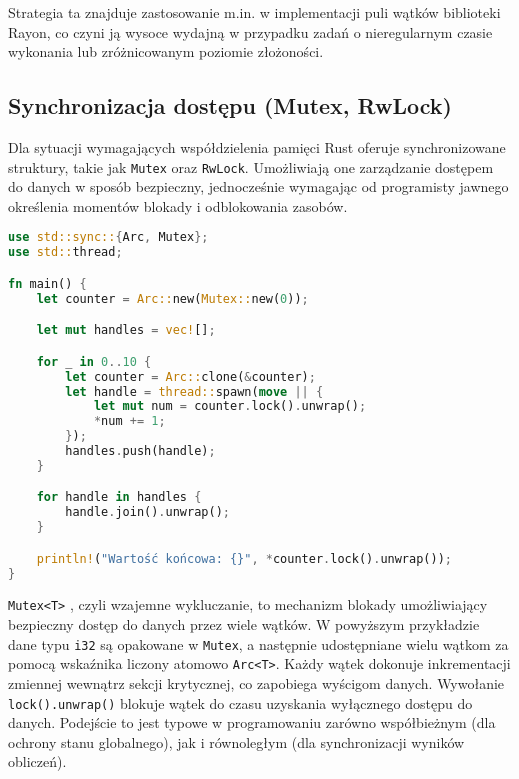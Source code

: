 Strategia ta znajduje zastosowanie m.in. w implementacji puli wątków biblioteki Rayon, co czyni ją wysoce wydajną w przypadku zadań o nieregularnym czasie wykonania lub zróżnicowanym poziomie złożoności.

\subsection{Synchronizacja dostępu (Mutex, RwLock)}
Dla sytuacji wymagających współdzielenia pamięci Rust oferuje synchronizowane struktury, takie jak \texttt{Mutex}  oraz \texttt{RwLock}. Umożliwiają one zarządzanie dostępem do danych w sposób bezpieczny, jednocześnie wymagając od programisty jawnego określenia momentów blokady i odblokowania zasobów.

\begin{lstlisting}[language=Rust, caption=Przykład użycia Mutex, label=mutex_example]
use std::sync::{Arc, Mutex};
use std::thread;

fn main() {
    let counter = Arc::new(Mutex::new(0));

    let mut handles = vec![];

    for _ in 0..10 {
        let counter = Arc::clone(&counter);
        let handle = thread::spawn(move || {
            let mut num = counter.lock().unwrap();
            *num += 1;
        });
        handles.push(handle);
    }

    for handle in handles {
        handle.join().unwrap();
    }

    println!("Wartość końcowa: {}", *counter.lock().unwrap());
}
\end{lstlisting}
\texttt{Mutex<T>} , czyli wzajemne wykluczanie, to mechanizm blokady umożliwiający bezpieczny dostęp do danych przez wiele wątków. W powyższym przykładzie dane typu \texttt{i32} są opakowane w \texttt{Mutex}, a następnie udostępniane wielu wątkom za pomocą wskaźnika liczony atomowo \texttt{Arc<T>}. Każdy wątek dokonuje inkrementacji zmiennej wewnątrz sekcji krytycznej, co zapobiega wyścigom danych. Wywołanie \texttt{lock().unwrap()} blokuje wątek do czasu uzyskania wyłącznego dostępu do danych. Podejście to jest typowe w programowaniu zarówno współbieżnym (dla ochrony stanu globalnego), jak i równoległym (dla synchronizacji wyników obliczeń). 

